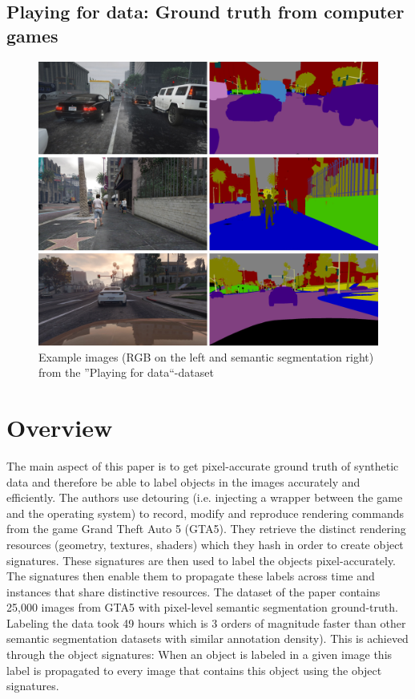 \documentclass[a4paper,cleardoubleempty,BCOR1cm]{scrbook}
\begin{document}
\newpage

\subsection{Playing for data: Ground truth from computer games}
\cite{Richter_2016_ECCV}

\begin{figure}[h]
	\centering
	\includegraphics[width=\textwidth]{images/P4D.png}
	\caption{Example images (RGB on the left and semantic segmentation right) from the ''Playing for data``-dataset}
	\label{P4D}
\end{figure}

\section{Overview}
The main aspect of this paper is to get pixel-accurate ground truth of synthetic data and therefore be able to label objects in the images accurately and efficiently.
The authors use detouring (i.e. injecting a wrapper between the game and the operating system) to record, modify and reproduce rendering commands from the game Grand Theft Auto 5 (GTA5). They retrieve the distinct rendering resources (geometry, textures, shaders) which they hash in order to create object signatures. These signatures are then used to label the objects pixel-accurately. The signatures then enable them to propagate these labels across time and instances that share distinctive resources. The dataset of the paper contains 25,000 images from GTA5 with pixel-level semantic segmentation ground-truth. Labeling the data took 49 hours  which is 3 orders of magnitude faster than other semantic segmentation datasets with similar annotation density). This is achieved through the object signatures: When an object is labeled in a given image this label is propagated to every image that contains this object using the object signatures. 
\end{document}
